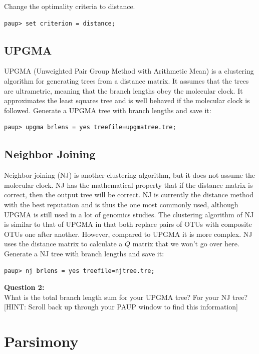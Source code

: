 \documentclass[11pt]{article}
\begin{document}
Change the optimality criteria to distance.
\begin{verbatim}
paup> set criterion = distance;
\end{verbatim}

\subsection{UPGMA}

UPGMA (Unweighted Pair Group Method with Arithmetic Mean) 
is a clustering algorithm for generating trees from a distance matrix. It assumes that the trees are ultrametric, meaning that the branch lengths obey the molecular clock. It approximates the least squares tree and is well behaved if the molecular clock is followed. Generate a UPGMA tree with branch lengths and save it:

\begin{verbatim}
paup> upgma brlens = yes treefile=upgmatree.tre;
\end{verbatim}

\subsection{Neighbor Joining}
Neighbor joining (NJ) is another clustering algorithm, but it does not assume the molecular clock. 
NJ has the mathematical property that if the distance matrix is correct, then the output tree will be correct.
NJ is currently the distance method with the best reputation and is thus the one most commonly used, although UPGMA is still used in a lot of genomics studies. The clustering algorithm of NJ is similar to that of UPGMA in that both replace pairs of OTUs with composite OTUs one after another. 
However, compared to UPGMA it is more complex. NJ uses the distance matrix to calculate
a $Q$ matrix that we won't go over here.
Generate a NJ tree with branch lengths and save it:

\begin{verbatim}
paup> nj brlens = yes treefile=njtree.tre;
\end{verbatim}


\begin{framed}
\noindent
\textbf{Question 2:} \\
What is the total branch length sum for your UPGMA tree? 
For your NJ tree? 
[HINT: Scroll back up through your PAUP window to find this information]
\end{framed}

\section{Parsimony}
\end{document}
